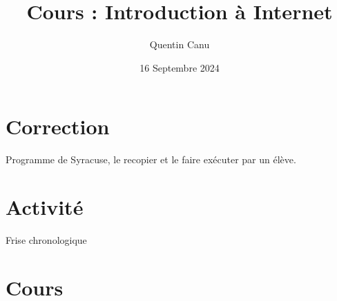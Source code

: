 \documentclass{article}
\title{Cours : Introduction à Internet}
\date{16 Septembre 2024}
\author{Quentin Canu}
\begin{document}
\maketitle

\section{Correction}
Programme de Syracuse, le recopier et le faire exécuter par un élève.

\section{Activité}
Frise chronologique
\section{Cours}
\end{document}
